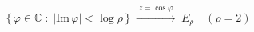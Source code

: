 \documentclass[preview]{standalone}
\begin{document}
\begin{align*}
\{\,\varphi\in\mathbb{C}\;:\;|\mathrm{Im}\,\varphi|<\log\rho\,\} \;\xrightarrow{\;z=\cos\varphi\;}\; E_\rho \quad(\rho=2)
\end{align*}
\end{document}
